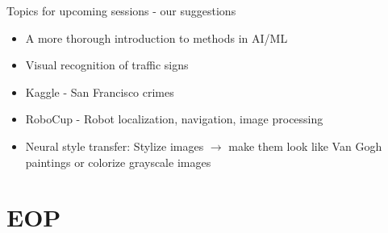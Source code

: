 \documentclass[aspectratio=169]{beamer}
\begin{document}
	\begin{frame}{Topics for upcoming sessions - our suggestions}
		\begin{itemize}
			\item A more thorough introduction to methods in AI/ML
			\item Visual recognition of traffic signs
			\item Kaggle - San Francisco crimes
			\item RoboCup - Robot localization, navigation, image processing
			\item Neural style transfer: Stylize images $\rightarrow$ make them look like Van Gogh paintings or colorize grayscale images 
		\end{itemize}
	\end{frame}

\section{EOP}
\end{document}
